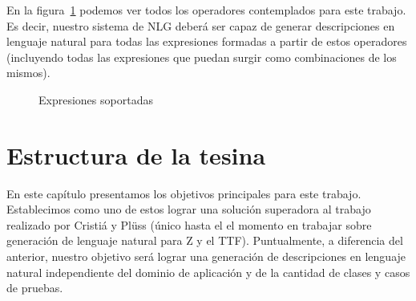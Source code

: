 En la figura~\ref{fig:alcance} podemos ver todos los operadores contemplados para este trabajo. Es decir, nuestro sistema de NLG deberá ser capaz de generar descripciones en lenguaje natural para todas las expresiones formadas a partir de estos operadores (incluyendo todas las expresiones que puedan surgir como combinaciones de los mismos).

\begin{figure}[H]
  \caption{Expresiones soportadas}
  \label{fig:alcance}
\end{figure}

\section{Estructura de la tesina}
En este capítulo presentamos los objetivos principales para este trabajo. Establecimos como uno de estos lograr una solución superadora al trabajo realizado por Cristiá y Plüss \cite{cristia_pluss} (único hasta el el momento en trabajar sobre generación de lenguaje natural para Z y el TTF). Puntualmente, a diferencia del anterior, nuestro objetivo será lograr una generación de descripciones en lenguaje natural independiente del dominio de aplicación y de la cantidad de clases y casos de pruebas.


